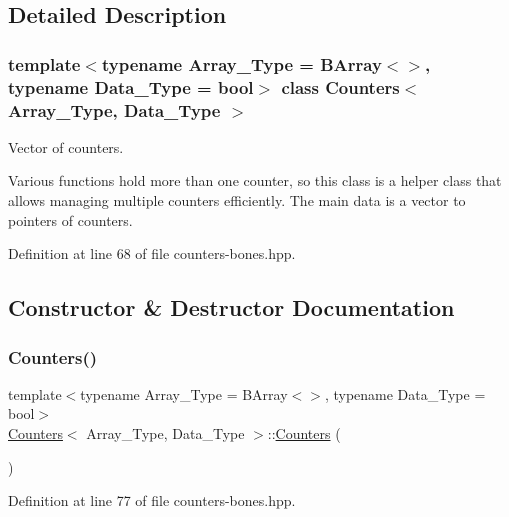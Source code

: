 \subsection{Detailed Description}
\subsubsection*{template$<$typename Array\+\_\+\+Type = B\+Array$<$$>$, typename Data\+\_\+\+Type = bool$>$\newline
class Counters$<$ Array\+\_\+\+Type, Data\+\_\+\+Type $>$}

Vector of counters. 

Various functions hold more than one counter, so this class is a helper class that allows managing multiple counters efficiently. The main data is a vector to pointers of counters. 

Definition at line 68 of file counters-\/bones.\+hpp.



\subsection{Constructor \& Destructor Documentation}
\mbox{\label{class_counters_a98e4efd06b3d878609911e392a8f42ce}} 
\subsubsection{\texorpdfstring{Counters()}{Counters()}\hspace{0.1cm}{\footnotesize\ttfamily [1/2]}}
{\footnotesize\ttfamily template$<$typename Array\+\_\+\+Type = B\+Array$<$$>$, typename Data\+\_\+\+Type = bool$>$ \\
\hyperlink{class_counters}{Counters}$<$ Array\+\_\+\+Type, Data\+\_\+\+Type $>$\+::\hyperlink{class_counters}{Counters} (\begin{DoxyParamCaption}{ }\end{DoxyParamCaption})\hspace{0.3cm}{\ttfamily [inline]}}



Definition at line 77 of file counters-\/bones.\+hpp.

\mbox{\label{class_counters_a6ce3fa5d32d646efb5d83fa1feaf5e95}} 
